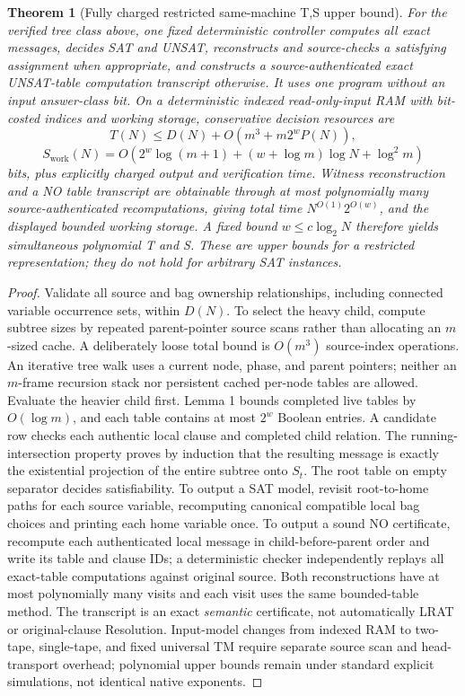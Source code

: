 \documentclass[11pt]{article}
\newtheorem{theorem}{Theorem}
\begin{document}
\begin{theorem}[Fully charged restricted same-machine T,S upper bound]
For the verified tree class above, one fixed deterministic controller computes all exact messages, decides SAT and UNSAT, reconstructs and source-checks a satisfying assignment when appropriate, and constructs a source-authenticated exact UNSAT-table computation transcript otherwise. It uses \emph{one} program without an input answer-class bit. On a deterministic indexed read-only-input RAM with bit-costed indices and working storage, conservative decision resources are
\[
 \boxed{T(N)\le D(N)+O(m^3+m2^wP(N)),}
\]
\[
 \boxed{S_{\mathrm{work}}(N)=
 O\!\left(2^w\log(m+1)+(w+\log m)\log N+\log^2m\right)}
\]
bits, plus explicitly charged output and verification time. Witness reconstruction and a NO table transcript are obtainable through at most polynomially many source-authenticated recomputations, giving total time $N^{O(1)}2^{O(w)}$, and the displayed bounded working storage. A fixed bound $w\le c\log_2N$ therefore yields simultaneous polynomial T and S. These are \emph{upper bounds} for a restricted representation; they do not hold for arbitrary SAT instances.
\end{theorem}
\begin{proof}
Validate all source and bag ownership relationships, including connected variable occurrence sets, within $D(N)$. To select the heavy child, compute subtree sizes by repeated parent-pointer source scans rather than allocating an $m$-sized cache. A deliberately loose total bound is $O(m^3)$ source-index operations. An iterative tree walk uses a current node, phase, and parent pointers; neither an $m$-frame recursion stack nor persistent cached per-node tables are allowed. Evaluate the heavier child first. Lemma 1 bounds completed live tables by $O(\log m)$, and each table contains at most $2^w$ Boolean entries. A candidate row checks each authentic local clause and completed child relation. The running-intersection property proves by induction that the resulting message is exactly the existential projection of the entire subtree onto $S_t$. The root table on empty separator decides satisfiability.
To output a SAT model, revisit root-to-home paths for each source variable, recomputing canonical compatible local bag choices and printing each home variable once. To output a sound NO certificate, recompute each authenticated local message in child-before-parent order and write its table and clause IDs; a deterministic checker independently replays all exact-table computations against original source. Both reconstructions have at most polynomially many visits and each visit uses the same bounded-table method. The transcript is an exact \emph{semantic} certificate, not automatically LRAT or original-clause Resolution. Input-model changes from indexed RAM to two-tape, single-tape, and fixed universal TM require separate source scan and head-transport overhead; polynomial upper bounds remain under standard explicit simulations, not identical native exponents.
\end{proof}
\end{document}
